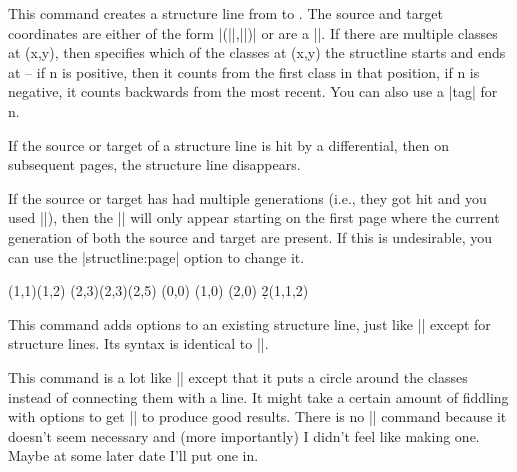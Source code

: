 \documentclass{ltxdoc}
\begin{document}
\begin{sseqdata}[name=ex1,degree={#1}{1-#1}]
\begin{command}{\structline{}}
This command creates a structure line from  to . The source and target coordinates are either of the form |(||,||)| or are a ||. If there are multiple classes at (x,y), then  specifies which of the classes at (x,y) the structline starts and ends at -- if n is positive, then it counts from the first class in that position, if n is negative, it counts backwards from the most recent. You can also use a |tag| for n.

If the source or target of a structure line is hit by a differential, then on subsequent pages, the structure line disappears.

If the source or target has had multiple generations (i.e., they got hit and you used |\replaceclass|), then the |\structline| will only appear starting on the first page where the current generation of both the source and target are present. If this is undesirable, you can use the |structline:page| option to change it.
\begin{codeexample}[width=9cm]
\sseqnewgroup*{}
\begin{sseqdata}[name=structline example,
                 classes={circle,fill},
                 Adams grading, no axes]
\class(1,1)\class(1,2)
\class(2,3)\class(2,3)\class(2,5)
\tower[classes=blue](0,0)
\tower[struct lines=dashed,orange](1,0)
\tower[struct lines=red](2,0)
\d2(1,1,2)
\end{sseqdata}
\printpage[name=structline example,page=2]
\hskip1cm
\printpage[name=structline example,page=3]
\end{codeexample}
\end{command}

\begin{command}{}
This command adds options to an existing structure line, just like |\classoptions| except for structure lines. Its syntax is identical to |\structline|.
\end{command}

\begin{command}{\circleclasses{}}
This command is a lot like |\structline| except that it puts a circle around the classes instead of connecting them with a line. It might take a certain amount of fiddling with options to get |\circleclasses| to produce good results. There is no |\circleclassesoptions| command because it doesn't seem necessary and (more importantly) I didn't feel like making one. Maybe at some later date I'll put one in.
\end{command}


\end{sseqdata}
\end{document}
